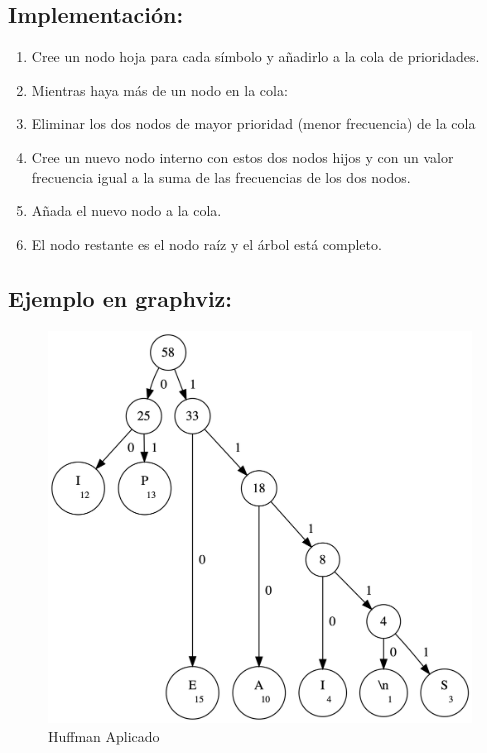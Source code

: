 \documentclass[]{article}
\begin{document}
	\subsection{Implementación:}
		\begin{enumerate}
			\item Cree un nodo hoja para cada símbolo y añadirlo a la cola de prioridades.
			\item Mientras haya más de un nodo en la cola:
			\item Eliminar los dos nodos de mayor prioridad (menor frecuencia) de la cola
			\item Cree un nuevo nodo interno con estos dos nodos hijos y con un valor frecuencia igual a la suma de las frecuencias de los dos nodos.
			\item Añada el nuevo nodo a la cola.
			\item El nodo restante es el nodo raíz y el árbol está completo.
		\end{enumerate}
	\subsection{Ejemplo en graphviz:}
	\begin{figure}[H]
		\centering\includegraphics[width=\textwidth]{graphviz/huffman.png}
		\caption{Huffman Aplicado}
		\label{fig:Huffman Aplicado}
	\end{figure}
\end{document}
